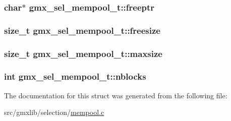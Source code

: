 \hypertarget{structgmx__sel__mempool__t_a2b7446cad910e6e6728dc2b169842a2c}{
\subsubsection[{freeptr}]{\setlength{\rightskip}{0pt plus 5cm}char$\ast$ {\bf gmx\-\_\-sel\-\_\-mempool\-\_\-t\-::freeptr}}}\label{structgmx__sel__mempool__t_a2b7446cad910e6e6728dc2b169842a2c}
\hypertarget{structgmx__sel__mempool__t_ae7354978f237cc4f1051e0099180e624}{
\subsubsection[{freesize}]{\setlength{\rightskip}{0pt plus 5cm}size\-\_\-t {\bf gmx\-\_\-sel\-\_\-mempool\-\_\-t\-::freesize}}}\label{structgmx__sel__mempool__t_ae7354978f237cc4f1051e0099180e624}
\hypertarget{structgmx__sel__mempool__t_a3f597a89db451db3f0bd5c3f5b393ffe}{
\subsubsection[{maxsize}]{\setlength{\rightskip}{0pt plus 5cm}size\-\_\-t {\bf gmx\-\_\-sel\-\_\-mempool\-\_\-t\-::maxsize}}}\label{structgmx__sel__mempool__t_a3f597a89db451db3f0bd5c3f5b393ffe}
\hypertarget{structgmx__sel__mempool__t_a78230677072396ef32529353b2fe2455}{
\subsubsection[{nblocks}]{\setlength{\rightskip}{0pt plus 5cm}int {\bf gmx\-\_\-sel\-\_\-mempool\-\_\-t\-::nblocks}}}\label{structgmx__sel__mempool__t_a78230677072396ef32529353b2fe2455}


\-The documentation for this struct was generated from the following file\-:\begin{DoxyCompactItemize}
\item 
src/gmxlib/selection/\hyperlink{mempool_8c}{mempool.\-c}\end{DoxyCompactItemize}
